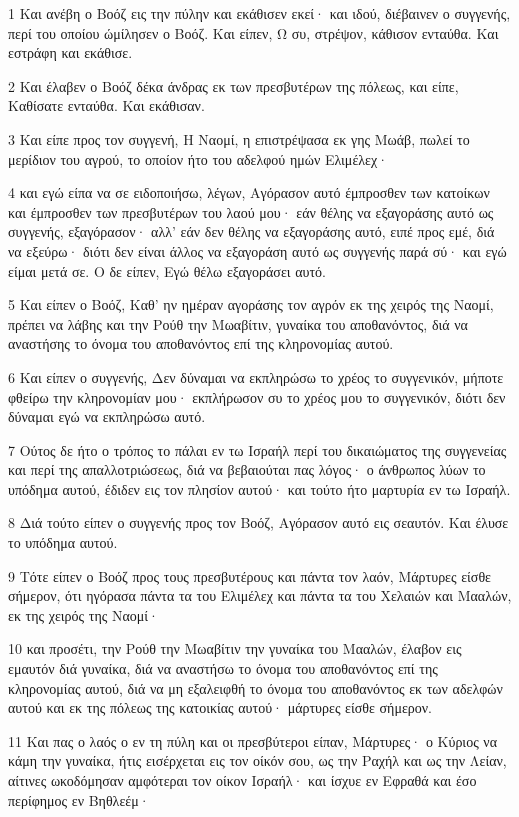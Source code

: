 \par 1 Και ανέβη ο Βοόζ εις την πύλην και εκάθισεν εκεί· και ιδού, διέβαινεν ο συγγενής, περί του οποίου ώμίλησεν ο Βοόζ. Και είπεν, Ω συ, στρέψον, κάθισον ενταύθα. Και εστράφη και εκάθισε.
\par 2 Και έλαβεν ο Βοόζ δέκα άνδρας εκ των πρεσβυτέρων της πόλεως, και είπε, Καθίσατε ενταύθα. Και εκάθισαν.
\par 3 Και είπε προς τον συγγενή, Η Ναομί, η επιστρέψασα εκ γης Μωάβ, πωλεί το μερίδιον του αγρού, το οποίον ήτο του αδελφού ημών Ελιμέλεχ·
\par 4 και εγώ είπα να σε ειδοποιήσω, λέγων, Αγόρασον αυτό έμπροσθεν των κατοίκων και έμπροσθεν των πρεσβυτέρων του λαού μου· εάν θέλης να εξαγοράσης αυτό ως συγγενής, εξαγόρασον· αλλ' εάν δεν θέλης να εξαγοράσης αυτό, ειπέ προς εμέ, διά να εξεύρω· διότι δεν είναι άλλος να εξαγοράση αυτό ως συγγενής παρά σύ· και εγώ είμαι μετά σε. Ο δε είπεν, Εγώ θέλω εξαγοράσει αυτό.
\par 5 Και είπεν ο Βοόζ, Καθ' ην ημέραν αγοράσης τον αγρόν εκ της χειρός της Ναομί, πρέπει να λάβης και την Ρούθ την Μωαβίτιν, γυναίκα του αποθανόντος, διά να αναστήσης το όνομα του αποθανόντος επί της κληρονομίας αυτού.
\par 6 Και είπεν ο συγγενής, Δεν δύναμαι να εκπληρώσω το χρέος το συγγενικόν, μήποτε φθείρω την κληρονομίαν μου· εκπλήρωσον συ το χρέος μου το συγγενικόν, διότι δεν δύναμαι εγώ να εκπληρώσω αυτό.
\par 7 Ούτος δε ήτο ο τρόπος το πάλαι εν τω Ισραήλ περί του δικαιώματος της συγγενείας και περί της απαλλοτριώσεως, διά να βεβαιούται πας λόγος· ο άνθρωπος λύων το υπόδημα αυτού, έδιδεν εις τον πλησίον αυτού· και τούτο ήτο μαρτυρία εν τω Ισραήλ.
\par 8 Διά τούτο είπεν ο συγγενής προς τον Βοόζ, Αγόρασον αυτό εις σεαυτόν. Και έλυσε το υπόδημα αυτού.
\par 9 Τότε είπεν ο Βοόζ προς τους πρεσβυτέρους και πάντα τον λαόν, Μάρτυρες είσθε σήμερον, ότι ηγόρασα πάντα τα του Ελιμέλεχ και πάντα τα του Χελαιών και Μααλών, εκ της χειρός της Ναομί·
\par 10 και προσέτι, την Ρούθ την Μωαβίτιν την γυναίκα του Μααλών, έλαβον εις εμαυτόν διά γυναίκα, διά να αναστήσω το όνομα του αποθανόντος επί της κληρονομίας αυτού, διά να μη εξαλειφθή το όνομα του αποθανόντος εκ των αδελφών αυτού και εκ της πόλεως της κατοικίας αυτού· μάρτυρες είσθε σήμερον.
\par 11 Και πας ο λαός ο εν τη πύλη και οι πρεσβύτεροι είπαν, Μάρτυρες· ο Κύριος να κάμη την γυναίκα, ήτις εισέρχεται εις τον οίκόν σου, ως την Ραχήλ και ως την Λείαν, αίτινες ωκοδόμησαν αμφότεραι τον οίκον Ισραήλ· και ίσχυε εν Εφραθά και έσο περίφημος εν Βηθλεέμ·
